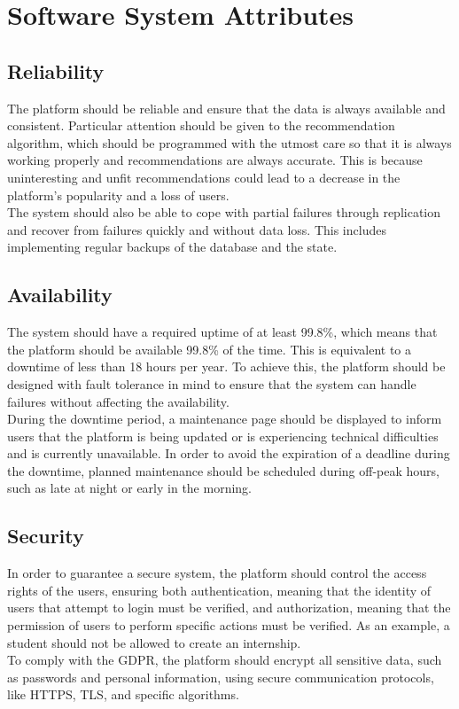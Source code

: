 \section{Software System Attributes}
\subsection{Reliability}
The platform should be reliable and ensure that the data is always available and consistent. Particular attention should be given to the
recommendation algorithm, which should be programmed with the utmost care so that it is always working properly and recommendations are always accurate. 
This is because uninteresting and unfit recommendations could lead to a decrease in the platform's popularity and a loss of users. \\
The system should also be able to cope with partial failures through replication and recover from failures quickly and without data loss. 
This includes implementing regular backups of the database and the state.

\subsection{Availability}
The system should have a required uptime of at least 99.8\%, which means that the platform should be available 99.8\% of the time. 
This is equivalent to a downtime of less than 18 hours per year. To achieve this, the platform should be designed with fault tolerance 
in mind to ensure that the system can handle failures without affecting the availability. \\
During the downtime period, a maintenance page should be displayed to inform users that the platform is being updated or is experiencing
technical difficulties and is currently unavailable. In order to avoid the expiration of a deadline during the downtime, planned maintenance 
should be scheduled during off-peak hours, such as late at night or early in the morning.

\subsection{Security}
In order to guarantee a secure system, the platform should control the access rights of the users, ensuring both authentication, meaning that 
the identity of users that attempt to login must be verified, and authorization, meaning that the permission of users to perform specific actions
must be verified. As an example, a student should not be allowed to create an internship. \\
To comply with the GDPR, the platform should encrypt all sensitive data, such as passwords and personal information, using secure communication protocols, 
like HTTPS, TLS, and specific algorithms.

